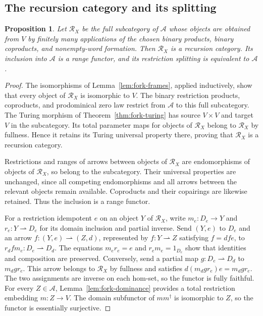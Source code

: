 \documentclass[11pt]{article}
\newtheorem{proposition}[theorem]{Proposition}
\begin{document}
\subsection{The recursion category and its splitting}

\begin{proposition}\label{prop:fork-recursion}
Let $\mathscr R_X$ be the full subcategory of $\mathcal A$
whose objects are obtained from $V$ by finitely many applications
of the chosen binary products, binary coproducts, and nonempty-word formation.
Then $\mathscr R_X$ is a recursion category. Its inclusion
into $\mathcal A$ is a range functor, and its restriction
splitting is equivalent to $\mathcal A$.
\end{proposition}
\begin{proof}
The isomorphisms of Lemma~\ref{lem:fork-frames}, applied inductively,
show that every object of $\mathscr R_X$ is isomorphic to $V$.
The binary restriction products, coproducts, and prodominical
zero law restrict from $\mathcal A$ to this full subcategory.
The Turing morphism of Theorem~\ref{thm:fork-turing} has
source $V\times V$ and target $V$ in the subcategory.
Its total parameter maps for objects of $\mathscr R_X$ belong
to $\mathscr R_X$ by fullness. Hence it retains its Turing
universal property there, proving that $\mathscr R_X$ is a
recursion category.

Restrictions and ranges of arrows between objects of $\mathscr R_X$
are endomorphisms of objects of $\mathscr R_X$, so belong to the subcategory.
Their universal properties are unchanged, since all competing
endomorphisms and all arrows between the relevant objects remain
available. Coproducts and their copairings are likewise retained.
Thus the inclusion is a range functor.

For a restriction idempotent $e$ on an object $Y$ of $\mathscr R_X$,
write $m_e:D_e\to Y$ and $r_e:Y\rightharpoonup D_e$ for its
domain inclusion and partial inverse. Send $(Y,e)$ to $D_e$
and an arrow $f:(Y,e)\rightharpoonup(Z,d)$, represented by
$f:Y\rightharpoonup Z$ satisfying $f=dfe$, to
$r_d f m_e:D_e\rightharpoonup D_d$.
The equations $m_er_e=e$ and $r_em_e=1_{D_e}$ show that
identities and composition are preserved. Conversely, send a
partial map $g:D_e\rightharpoonup D_d$ to $m_d g r_e$.
This arrow belongs to $\mathscr R_X$ by fullness and satisfies
$d(m_d g r_e)e=m_d g r_e$. The two assignments are inverse on
each hom-set, so the functor is fully faithful.
For every $Z\in\mathcal A$, Lemma~\ref{lem:fork-dominance}
provides a total restriction embedding $m:Z\to V$.
The domain subfunctor of $mm^\dagger$ is isomorphic to $Z$,
so the functor is essentially surjective.
\end{proof}
\end{document}
